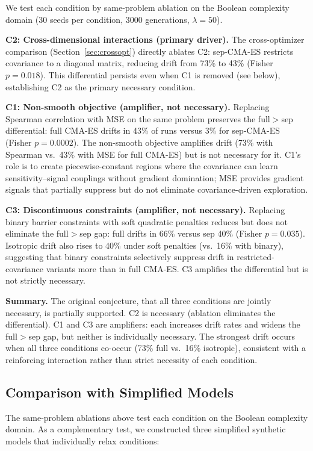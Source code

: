 \documentclass[twoside]{article}
\begin{document}
We test each condition by same-problem ablation on the Boolean complexity
domain (30 seeds per condition, 3000 generations, $\lambda = 50$).

\textbf{C2: Cross-dimensional interactions (primary driver).}
The cross-optimizer comparison (Section~\ref{sec:crossopt}) directly ablates
C2: sep-CMA-ES restricts covariance to a diagonal matrix, reducing drift
from 73\% to 43\% (Fisher $p = 0.018$). This differential persists even
when C1 is removed (see below), establishing C2 as the primary necessary
condition.

\textbf{C1: Non-smooth objective (amplifier, not necessary).}
Replacing Spearman correlation with MSE on the same problem preserves the
full$>$sep differential: full CMA-ES drifts in 43\% of runs versus 3\% for
sep-CMA-ES (Fisher $p = 0.0002$). The non-smooth objective amplifies drift
(73\% with Spearman vs.\ 43\% with MSE for full CMA-ES) but is not necessary
for it. C1's role is to create piecewise-constant regions where the covariance
can learn sensitivity--signal couplings without gradient domination; MSE
provides gradient signals that partially suppress but do not eliminate
covariance-driven exploration.

\textbf{C3: Discontinuous constraints (amplifier, not necessary).}
Replacing binary barrier constraints with soft quadratic penalties reduces
but does not eliminate the full$>$sep gap: full drifts in 66\% versus sep 40\%
(Fisher $p = 0.035$). Isotropic drift also rises to 40\% under soft
penalties (vs.\ 16\% with binary), suggesting that binary constraints
selectively suppress drift in restricted-covariance variants more than in
full CMA-ES. C3 amplifies the differential but is not strictly necessary.

\textbf{Summary.} The original conjecture, that all three
conditions are jointly necessary, is partially supported. C2 is
necessary (ablation eliminates the differential). C1 and C3 are amplifiers:
each increases drift rates and widens the full$>$sep gap, but neither is
individually necessary. The strongest drift occurs when all three conditions
co-occur (73\% full vs.\ 16\% isotropic), consistent with a reinforcing
interaction rather than strict necessity of each condition.

\subsection{Comparison with Simplified Models}

The same-problem ablations above test each condition on the Boolean complexity
domain. As a complementary test, we constructed three simplified synthetic
models that individually relax conditions:
\end{document}
